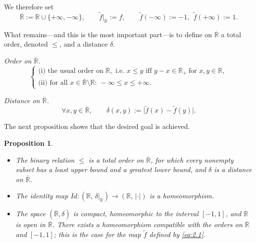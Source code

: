 \documentclass[12pt]{article}
\newtheorem{proposition}{Proposition}[section]
\theoremstyle{definition}
\begin{document}
We therefore set
\begin{equation}\label{eq:2.1}
\overline{\mathbb{R}}:=\mathbb{R}\cup\{+\infty,-\infty\},
\qquad
\tilde f\big|_{\mathbb{R}}:=f,\qquad
\tilde f(-\infty):=-1,\ \ \tilde f(+\infty):=1 .
\end{equation}

What remains—and this is the most important part—is to define on $\overline{\mathbb{R}}$ a total order, denoted $\le$, and a distance $\delta$.

\medskip\noindent
\textit{Order on $\overline{\mathbb{R}}$.}
\[
\begin{cases}
\text{(i) the usual order on }\mathbb{R},\text{ i.e.\ }x\le y\text{ iff }y-x\in\mathbb{R}_+\ \text{for }x,y\in\mathbb{R},\\[2pt]
\text{(ii) for all }x\in\overline{\mathbb{R}}\setminus\mathbb{R}:\ -\infty\le x\le +\infty .
\end{cases}
\]

\medskip\noindent
\textit{Distance on $\overline{\mathbb{R}}$.}
\begin{equation}\label{eq:2.2}
\forall x,y\in\overline{\mathbb{R}},\qquad
\delta(x,y):=\bigl|\tilde f(x)-\tilde f(y)\bigr|.
\end{equation}

The next proposition shows that the desired goal is achieved.

\begin{proposition}
\begin{itemize}[leftmargin=1.5em]
\item[(a)] The binary relation $\le$ is a total order on $\overline{\mathbb{R}}$, for which every nonempty subset has a least upper bound and a greatest lower bound, and $\delta$ is a distance on $\overline{\mathbb{R}}$.
\item[(b)] The identity map $Id:(\mathbb{R},\,\delta\!\big|_{\mathbb{R}})\to(\mathbb{R},\,|\cdot|)$ is a homeomorphism.
\item[(c)] The space $(\overline{\mathbb{R}},\delta)$ is compact, homeomorphic to the interval $[-1,1]$, and $\mathbb{R}$ is open in $\overline{\mathbb{R}}$.
There exists a homeomorphism compatible with the orders on $\overline{\mathbb{R}}$ and $[-1,1]$; this is the case for the map $\tilde f$ defined by \eqref{eq:2.1}.
\end{itemize}
\end{proposition}
\end{document}
